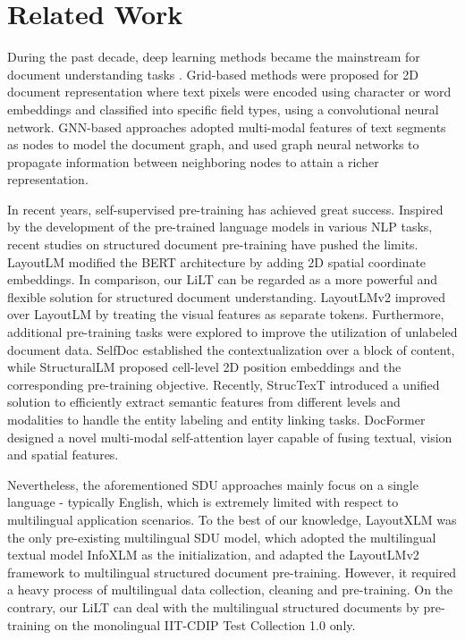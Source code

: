\documentclass[11pt]{article}
\begin{document}
\section{Related Work}
During the past decade, deep learning methods became the mainstream for 
document understanding tasks \cite{yangrw4,augustorw5,siegel2018extractingrw6}.
Grid-based methods \cite{katti2018chargridrw6,denk2019bertgrid,lin2021vibertgrid} were proposed for 2D document representation where text pixels were encoded using character or word embeddings and classified into specific field types, using a convolutional neural network. GNN-based approaches \cite{gcn,yu2021pick,tang2021matchvie} adopted multi-modal features of text segments as nodes to model the document graph, and used graph neural networks to propagate information between neighboring nodes to attain a richer representation.

In recent years, self-supervised pre-training has achieved great success. Inspired by the development of the pre-trained language models in various NLP tasks, recent studies on structured document pre-training \cite{Layoutlm,layoutlmv2,xu2021layoutxlm,li2021structurallm,li2021selfdoc,li2021structext,appalaraju2021docformer}  have pushed the limits. 
LayoutLM \cite{Layoutlm} modified the BERT \cite{devlin2019bert} architecture by adding 2D spatial coordinate embeddings.
In comparison, our LiLT can be regarded as a more powerful and flexible solution for structured  document  understanding.  
LayoutLMv2 \cite{layoutlmv2} improved over LayoutLM by treating the visual features as separate tokens.
Furthermore, additional pre-training tasks were explored to improve the utilization  of unlabeled document data.  SelfDoc \cite{li2021selfdoc}  established the contextualization over a block of content, while StructuralLM \cite{li2021structurallm} proposed  cell-level 2D position embeddings and the corresponding pre-training objective. Recently, StrucTexT \cite{li2021structext} introduced a unified solution to efficiently extract semantic features from different levels and modalities to handle the entity labeling and entity linking tasks. DocFormer \cite{appalaraju2021docformer} designed a novel multi-modal self-attention layer capable of fusing textual, vision and spatial features.

Nevertheless, the aforementioned SDU approaches mainly focus on a single language - typically English, which is extremely limited with respect to multilingual application scenarios.  
To the best of our knowledge, LayoutXLM \cite{xu2021layoutxlm} was the only pre-existing multilingual SDU model, which adopted the multilingual textual model InfoXLM \cite{chi2021infoxlm} as the initialization, and adapted the LayoutLMv2 \cite{layoutlmv2}  framework to multilingual structured document pre-training. However, it required a heavy process of multilingual  data collection, cleaning and pre-training. 
On the contrary,  our LiLT can deal with the multilingual structured documents by pre-training on the monolingual  IIT-CDIP Test Collection 1.0 \cite{cdip} only.
\end{document}
